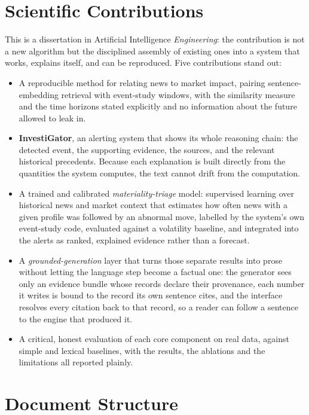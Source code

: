 \section{Scientific Contributions}
\label{sec:intro_contributions}

This is a dissertation in Artificial Intelligence \emph{Engineering}: the contribution is not a new
algorithm but the disciplined assembly of existing ones into a system that works, explains itself, and can
be reproduced. Five contributions stand out:

\begin{itemize}
  \item A reproducible method for relating news to market impact, pairing sentence-embedding retrieval
        with event-study windows, with the similarity measure and the time horizons stated explicitly and
        no information about the future allowed to leak in.
  \item \textbf{InvestiGator}, an alerting system that shows its whole reasoning chain: the detected event, the
        supporting evidence, the sources, and the relevant historical precedents. Because each explanation
        is built directly from the quantities the system computes, the text cannot drift from the
        computation.
  \item A trained and calibrated \emph{materiality-triage} model: supervised learning over historical
        news and market context that estimates how often news with a given profile was followed by an
        abnormal move, labelled by the system's own event-study code, evaluated against a volatility
        baseline, and integrated into the alerts as ranked, explained evidence rather than a forecast.
  \item A \emph{grounded-generation} layer that turns those separate results into prose without letting
        the language step become a factual one: the generator sees only an evidence bundle whose records
        declare their provenance, each number it writes is bound to the record its own sentence cites,
        and the interface resolves every citation back to that record, so a reader can follow a sentence
        to the engine that produced it.
  \item A critical, honest evaluation of each core component on real data, against simple and lexical
        baselines, with the results, the ablations and the limitations all reported plainly.
\end{itemize}

\section{Document Structure}
\label{sec:intro_structure}

